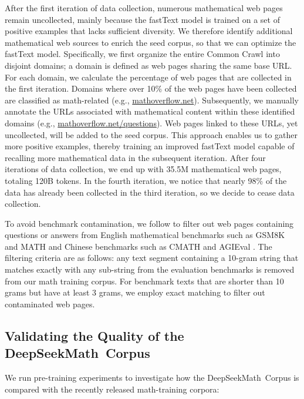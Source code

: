 After the first iteration of data collection, numerous mathematical web pages remain uncollected, mainly because the fastText model is trained on a set of positive examples that lacks sufficient diversity. We therefore identify additional mathematical web sources to enrich the seed corpus, so that we can optimize the fastText model. Specifically, we first organize the entire Common Crawl into disjoint domains; a domain is defined as web pages sharing the same base URL. For each domain, we calculate the percentage of web pages that are collected in the first iteration. Domains where over 10\% of the web pages have been collected are classified as math-related (e.g., \url{mathoverflow.net}).
Subsequently, we manually annotate the URLs associated with mathematical content within these identified domains (e.g., \url{mathoverflow.net/questions}).
Web pages linked to these URLs, yet uncollected, will be added to the seed corpus. This approach enables us to gather more positive examples, thereby training an improved fastText model capable of recalling more mathematical data in the subsequent iteration. After four iterations of data collection, we end up with 35.5M mathematical web pages, totaling 120B tokens. In the fourth iteration, we notice that nearly 98\% of the data has already been collected in the third iteration, so we decide to cease data collection.

To avoid benchmark contamination, we follow \cite{deepseek-coder} to filter out web pages containing questions or answers from English mathematical benchmarks such as GSM8K \citep{gsm8k} and MATH \citep{MATH} and Chinese benchmarks such as CMATH \citep{wei2023cmath} and AGIEval \citep{agieval}. The filtering criteria are as follows: any text segment containing a 10-gram string that matches exactly with any sub-string from the evaluation benchmarks is removed from our math training corpus. For benchmark texts that are shorter than 10 grams but have at least 3 grams, we employ exact matching to filter out contaminated web pages.

\subsection{Validating the Quality of the DeepSeekMath~Corpus}

We run pre-training experiments to investigate how the DeepSeekMath~Corpus is compared with the recently released math-training corpora:

